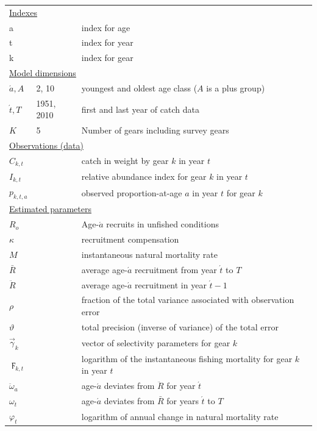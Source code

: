 \begin{center}
\begin{longtable}{lll}
\multicolumn{3}{l}{\underline{Indexes}}\\
a & & index for age\\
t & & index for year\\
k & & index for gear\\
\multicolumn{3}{l}{\underline{Model dimensions}}\\
$\acute{a}, A$  & 2, 10         & youngest and oldest age class ($A$ is a plus group)\\
$\acute{t}, T$  & 1951, 2010    & first and last year of catch data\\
$K$             & 5             & Number of gears including survey gears\\
\multicolumn{3}{l}{\underline{Observations (data)}}\\
$C_{k,t}$       & & catch in weight by gear $k$ in year $t$\\
$I_{k,t}$       & & relative abundance index for gear $k$ in year $t$\\
$p_{k,t,a}$     & & observed proportion-at-age $a$ in year $t$ for gear $k$\\
\multicolumn{3}{l}{\underline{Estimated parameters}}\\
$R_o$               & & Age-$\acute{a}$ recruits in unfished conditions\\
$\kappa$            & & recruitment compensation\\
$M$                 & & instantaneous natural mortality rate \\
$\bar{R}$           & & average age-$\acute{a}$ recruitment from year $\acute{t}$ to $T$\\
$\ddot{R}$          & & average age-$\acute{a}$ recruitment in year $\acute{t}-1$\\
$\rho$              & & fraction of the total variance associated with observation error\\
$\vartheta$         & & total precision (inverse of variance) of the total error\\
$\vec{\gamma}_k$    & & vector of selectivity parameters for gear $k$\\
$\digamma_{k,t}$    & & logarithm of the instantaneous fishing mortality for gear $k$ in year $t$\\
$\ddot{\omega}_a$   & & age-$\acute{a}$ deviates from $\ddot{R}$ for year $\acute{t}$\\
$\omega_t$          & & age-$\acute{a}$ deviates from $\bar{R}$ for years $\acute{t}$ to $T$\\
$\varphi_t$         & & logarithm of annual change in natural mortality rate\\

\end{longtable}
\end{center}
